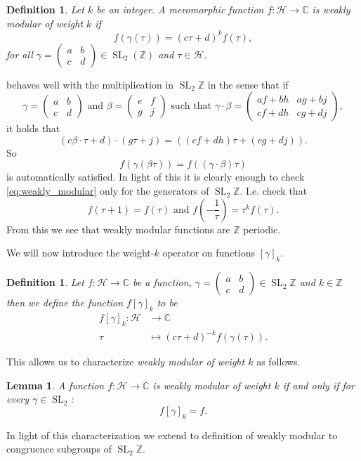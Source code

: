 \documentclass[titlepage,a4paper]{article}
\theoremstyle{theoremdd}
\newtheorem{lemma}[theorem]{Lemma}
\theoremstyle{definitiondd}
\newtheorem{definition}[theorem]{Definition}
\theoremstyle{remarkdd}
\newcommand{\Z}{\mathbb{Z}}
\newcommand{\C}{\mathbb{C}}
\DeclareMathOperator{\SL}{SL}
\begin{document}
\begin{definition}
	Let $k$ be an integer. 
	A meromorphic function $f: \mathcal{H}  \to \C$ is \emph{weakly modular of weight $k$ } if \begin{equation} \label{eq:weakly_modular}
		f(\gamma(\tau)) = (c\tau + d)^{k}f(\tau)
	,\end{equation}
	for all $\gamma = \begin{pmatrix} a & b \\ c & d \end{pmatrix}  \in \SL_2(\Z)$ and $\tau \in \mathcal{H} $. 
\end{definition}
	 behaves well with the multiplication in $\SL_2\Z$ in the sense that if \[
		\gamma = \begin{pmatrix} a & b \\ c & d \end{pmatrix} \text{ and }\beta = \begin{pmatrix} e & f \\ g & j \end{pmatrix} \text{ such that }
		\gamma \cdot  \beta = \begin{pmatrix} af + bh & ag + bj \\ cf + dh & cg + dj\end{pmatrix} 
	,\]
	it holds that 
	\[
		(c \beta\cdot \tau + d)\cdot (g \tau + j) = ((cf + dh) \tau + (cg + dj))
	.\] 
	So \[
		f(\gamma (\beta \tau)) = f ((\gamma \cdot  \beta)\tau)
	\] 
	is automatically satisfied.
In light of this it is clearly enough to check \eqref{eq:weakly_modular} only for the generators of $\SL_2\Z$. I.e. check that
\begin{equation}\label{eq:sufficient_weakly_modular}
	f(\tau + 1) = f(\tau) \text{ and } f\left(-\frac{1}{\tau}\right)  = \tau^{k}f(\tau)
.\end{equation} 
From this we see that weakly modular functions are $\Z$ periodic. 

We will now introduce the weight-$k$ operator on functions $[\gamma]_k$.
 \begin{definition}
	 Let $f: \mathcal{H}  \to \C$ be a function,  $\gamma = \begin{pmatrix} a & b \\ c & d \end{pmatrix} \in \SL_2\Z$ and $k \in \Z$ then we define the function $f[\gamma]_k$ to be 
	  \begin{align*}
		  f[\gamma]_k: \mathcal{H}  &\longrightarrow \C \\
		  \tau &\longmapsto (c\tau + d)^{-k}f(\gamma(\tau))
	 .\end{align*}
\end{definition}
This allows us to characterize  \emph{weakly modular of weight  $k$} as follows.
 \begin{lemma}
	 A function $f: \mathcal{H}  \to \C$ is weakly modular of weight $k$ if and only if for every $\gamma \in \SL_2$: \[
		 f[\gamma]_k = f
	 .\] 
\end{lemma}
In light of this characterization we extend to definition of weakly modular to congruence subgroups of $\SL_2\Z$. 
\end{document}
